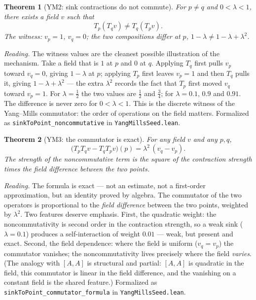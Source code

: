 \documentclass[aps,prd,preprint,superscriptaddress,amsmath,amssymb]{revtex4-2}
\newtheorem{theorem}{Theorem}[section]
\begin{document}
\begin{theorem}[YM2: sink contractions do not commute]
\label{thm:ym2}
For $p\neq q$ and $0<\lambda<1$, there exists a field $v$ such that
\begin{equation}
T_p(T_q v)\neq T_q(T_p v).
\end{equation}
The witness: $v_p=1$, $v_q=0$; the two compositions differ at $p$,
$1-\lambda\neq 1-\lambda+\lambda^2$.
\end{theorem}

\emph{Reading.}  The witness values are the cleanest possible
illustration of the mechanism.  Take a field that is $1$ at $p$ and
$0$ at $q$.  Applying $T_q$ first pulls $v_p$ toward $v_q=0$, giving
$1-\lambda$ at $p$; applying $T_p$ first leaves $v_p=1$ and then
$T_q$ pulls it, giving $1-\lambda+\lambda^2$ --- the extra $\lambda^2$
records the fact that $T_p$ first moved $v_q$ toward $v_p=1$.  For
$\lambda=\tfrac12$ the two values are $\tfrac12$ and $\tfrac34$; for
$\lambda=0.1$, $0.9$ and $0.91$.  The difference is never zero for
$0<\lambda<1$.  This is the discrete witness of the Yang--Mills
commutator: the order of operations on the field matters.
Formalized as \texttt{sinkToPoint\_noncommutative} in
\texttt{YangMillsSeed.lean}.

\begin{theorem}[YM3: the commutator is exact]
\label{thm:ym3}
For any field $v$ and any $p,q$,
\begin{equation}
\bigl(T_p T_q v - T_q T_p v\bigr)(p) = \lambda^2\,(v_q-v_p).
\end{equation}
The strength of the noncommutative term is the square of the
contraction strength times the field difference between the two
points.
\end{theorem}

\emph{Reading.}  The formula is exact --- not an estimate, not a
first-order approximation, but an identity proved by algebra.  The
commutator of the two operators is proportional to the \emph{field
difference} between the two points, weighted by $\lambda^2$.  Two
features deserve emphasis.  First, the quadratic weight: the
noncommutativity is second order in the contraction strength, so a
weak sink ($\lambda=0.1$) produces a self-interaction of weight
$0.01$ --- weak, but present and exact.  Second, the field
dependence: where the field is uniform ($v_q=v_p$) the commutator
vanishes; the noncommutativity lives precisely where the field
\emph{varies}.  (The analogy with $[A,A]$ is structural and partial:
$[A,A]$ is quadratic in the field, this commutator is linear in the
field difference, and the vanishing on a constant field is the shared
feature.)  Formalized as \texttt{sinkToPoint\_commutator\_formula} in
\texttt{YangMillsSeed.lean}.
\end{document}
